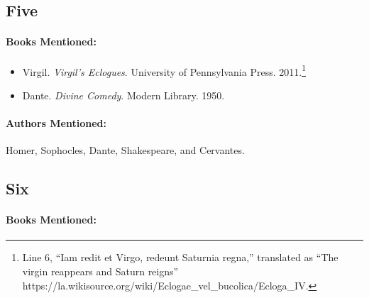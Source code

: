 \documentclass[12pt]{article}
\providecommand{\tightlist}{%
  \setlength{\itemsep}{0pt}\setlength{\parskip}{0pt}}
\begin{document}
\subsection{Five}\label{five}

\paragraph{Books Mentioned:}\label{books-mentioned-6}

\begin{itemize}
\tightlist
\item
  Virgil. \emph{Virgil's Eclogues}. University of Pennsylvania Press. 2011.\footnote{Line 6, ``Iam redit et Virgo, redeunt Saturnia regna,'' translated as ``The virgin reappears and Saturn reigns'' https://la.wikisource.org/wiki/Eclogae\_vel\_bucolica/Ecloga\_IV.}
\item
  Dante. \emph{Divine Comedy}. Modern Library. 1950.
\end{itemize}

\paragraph{Authors Mentioned:}\label{authors-mentioned-3}

Homer, Sophocles, Dante, Shakespeare, and Cervantes.

\subsection{Six}\label{six}

\paragraph{Books Mentioned:}\label{books-mentioned-7}
\end{document}
